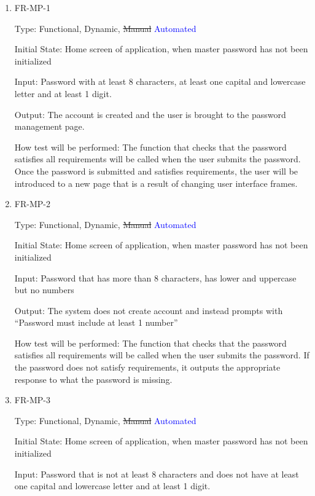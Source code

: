 \documentclass[12pt, titlepage]{article}
\begin{document}
\begin{enumerate}

\item{FR-MP-1\\}

Type: Functional, Dynamic, \sout{Manual} \textcolor{blue}{Automated}
					
Initial State: Home screen of application, when master password has not been initialized 
					
Input: Password with at least 8 characters, at least one capital and lowercase letter and at least 1 digit.
					
Output: The account is created and the user is brought to the password management page.

How test will be performed: The function that checks that the password satisfies all requirements will be called when the user submits the password. Once the password is submitted and satisfies requirements, the user will be introduced to a new page that is a result of changing user interface frames.
					
					
\item{FR-MP-2\\}

Type: Functional, Dynamic, \sout{Manual} \textcolor{blue}{Automated}

Initial State: Home screen of application, when master password has not been initialized

Input: Password that has more than 8 characters, has lower and uppercase but no numbers

Output: The system does not create account and instead prompts with “Password must include at least 1 number”

How test will be performed: The function that checks that the password satisfies all requirements will be called when the user submits the password. If the password does not satisfy requirements, it outputs the appropriate response to what the password is missing.

\item{FR-MP-3\\}

Type: Functional, Dynamic, \sout{Manual} \textcolor{blue}{Automated}

Initial State: Home screen of application, when master password has not been initialized 

Input: Password that is not at least 8 characters and does not have at least one capital and lowercase letter and at least 1 digit.


\end{enumerate}
\end{document}
